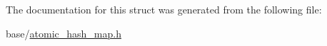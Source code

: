 The documentation for this struct was generated from the following file\-:\begin{DoxyCompactItemize}
\item 
base/\hyperlink{atomic__hash__map_8h}{atomic\-\_\-hash\-\_\-map.\-h}\end{DoxyCompactItemize}
